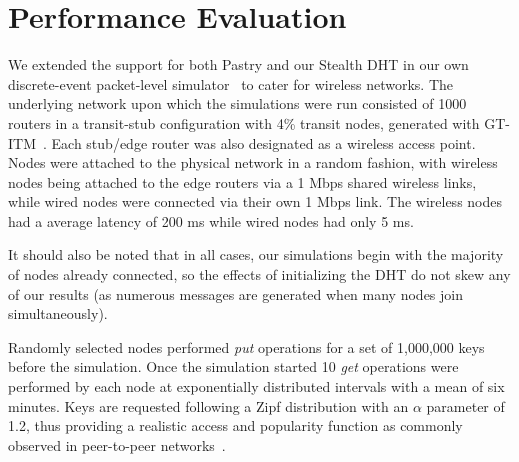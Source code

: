 \documentclass[conference]{IEEEtran}
\begin{document}
\section{Performance Evaluation}
\label{sect-eval}

We extended the support for both Pastry and our Stealth DHT in our
own discrete-event packet-level simulator~\cite{stealth1} to cater
for wireless networks. The underlying network upon which the
simulations were run consisted of 1000 routers in a transit-stub
configuration with 4\% transit nodes, generated with
GT-ITM~\cite{gtitm}. Each stub/edge router was also designated as a
wireless access point. Nodes were attached to the physical network
in a random fashion, with wireless nodes being attached to the edge
routers via a 1 Mbps shared wireless links, while wired nodes were
connected via their own 1 Mbps link. The wireless nodes had a
average latency of 200 ms while wired nodes had only 5 ms.

It should also be noted that in all cases, our simulations begin
with the majority of nodes already connected, so the effects of
initializing the DHT do not skew any of our results (as numerous
messages are generated when many nodes join simultaneously).

Randomly selected nodes performed \emph{put} operations for a set of
1,000,000 keys before the simulation. Once the simulation started 10
\emph{get} operations were performed by each node at exponentially
distributed intervals with a mean of six minutes. Keys are requested
following a Zipf distribution with an $\alpha$ parameter of 1.2,
thus providing a realistic access and popularity function as
commonly observed in peer-to-peer networks~\cite{zipf}.

\end{document}
